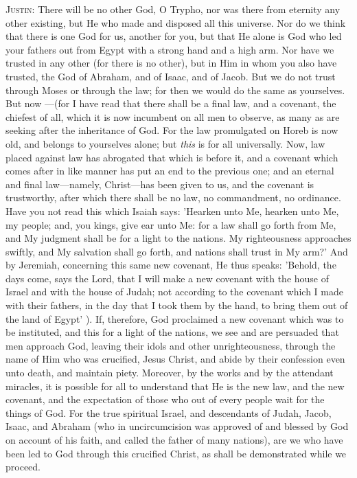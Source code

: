 \documentclass[9pt, twocolumn, oneside, a4paper]{memoir}
\newcommand{\gloss}[1]{%
    \marginpar[\RaggedLeft \footnotesize{#1}]{\RaggedRight \footnotesize{#1}}}
\begin{document}
\textsc{Justin:} There will be no other God, O Trypho, nor was there from eternity any other existing, but He who made and disposed all this universe. Nor do we think that there is one God for us, another for you, but that He alone is God who led your fathers out from Egypt with a strong hand and a high arm. Nor have we trusted in any other (for there is no other), but in Him in whom you also have trusted, the God of Abraham, and of Isaac, and of Jacob. But we do not trust through Moses or through the law; for then we would do the same as yourselves. But now —(for I have read that there shall be a final law, and a covenant, the chiefest  of all, which it is now incumbent on all men to observe, as many as are seeking after the inheritance of God. For the law promulgated on Horeb is now old, and belongs to yourselves alone; but \textit{this} is for all universally. Now, law placed against law has abrogated that which is before it, and a covenant which comes after in like manner has put an end to the previous one; and an eternal and final law—namely, Christ—has been given to us, and the covenant is trustworthy, after which there shall be no law, no commandment, no ordinance. Have you not read this which Isaiah says: 'Hearken unto Me, hearken unto Me, my people; and, you kings, give ear unto Me: for a law shall go forth from Me, and My judgment shall be for a light to the nations. My righteousness approaches swiftly, and My salvation shall go forth, and nations shall trust in My arm?'  And by Jeremiah, concerning this same new covenant, He thus speaks: 'Behold, the days come, says the Lord, that I will make a new covenant with the house of Israel and with the house of Judah; not according to the covenant which I made with their fathers, in the day that I took them by the hand, to bring them out of the land of Egypt' \gloss{Jeremiah 31:31-32}). If, therefore, God proclaimed a new covenant which was to be instituted, and this for a light of the nations, we see and are persuaded that men approach God, leaving their idols and other unrighteousness, through the name of Him who was crucified, Jesus Christ, and abide by their confession even unto death, and maintain piety. Moreover, by the works and by the attendant miracles, it is possible for all to understand that He is the new law, and the new covenant, and the expectation of those who out of every people wait for the  things of God. For the true spiritual Israel, and descendants of Judah, Jacob, Isaac, and Abraham (who in uncircumcision was approved of and blessed by God on account of his faith, and called the father of many nations), are we who have been led to God through this crucified Christ, as shall be demonstrated while we proceed.
\end{document}

